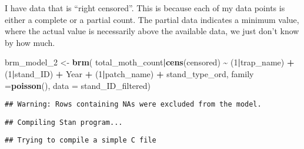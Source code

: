 \documentclass[
]{article}
\newenvironment{Shaded}{\begin{snugshade}}{\end{snugshade}}
\newcommand{\AttributeTok}[1]{\textcolor[rgb]{0.13,0.29,0.53}{#1}}
\newcommand{\DecValTok}[1]{\textcolor[rgb]{0.00,0.00,0.81}{#1}}
\newcommand{\FunctionTok}[1]{\textcolor[rgb]{0.13,0.29,0.53}{\textbf{#1}}}
\newcommand{\NormalTok}[1]{#1}
\newcommand{\OtherTok}[1]{\textcolor[rgb]{0.56,0.35,0.01}{#1}}
\newcommand{\SpecialCharTok}[1]{\textcolor[rgb]{0.81,0.36,0.00}{\textbf{#1}}}
\begin{document}
I have data that is ``right censored''. This is because each of my data
points is either a complete or a partial count. The partial data
indicates a minimum value, where the actual value is necessarily above
the available data, we just don't know by how much.

\begin{Shaded}
\begin{Highlighting}[]
\NormalTok{brm\_model\_2 }\OtherTok{\textless{}{-}} \FunctionTok{brm}\NormalTok{(}
\NormalTok{  total\_moth\_count}\SpecialCharTok{|}\FunctionTok{cens}\NormalTok{(censored) }\SpecialCharTok{\textasciitilde{}}\NormalTok{ (}\DecValTok{1}\SpecialCharTok{|}\NormalTok{trap\_name) }
  \SpecialCharTok{+}\NormalTok{ (}\DecValTok{1}\SpecialCharTok{|}\NormalTok{stand\_ID) }\SpecialCharTok{+}\NormalTok{ Year }\SpecialCharTok{+}
\NormalTok{    (}\DecValTok{1}\SpecialCharTok{|}\NormalTok{patch\_name) }\SpecialCharTok{+}\NormalTok{ stand\_type\_ord, }
  \AttributeTok{family =}\FunctionTok{poisson}\NormalTok{(), }\AttributeTok{data =}\NormalTok{ stand\_ID\_filtered)}
\end{Highlighting}
\end{Shaded}

\begin{verbatim}
## Warning: Rows containing NAs were excluded from the model.
\end{verbatim}

\begin{verbatim}
## Compiling Stan program...
\end{verbatim}

\begin{verbatim}
## Trying to compile a simple C file
\end{verbatim}
\end{document}
